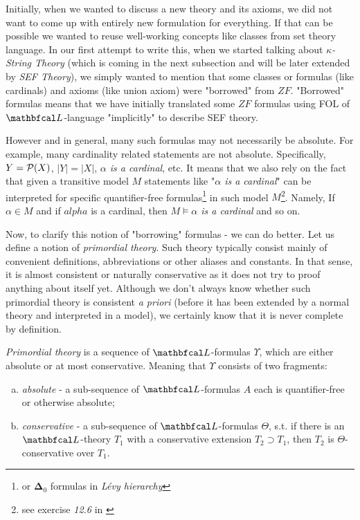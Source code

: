 Initially, when we wanted to discuss a new theory and its axioms, we did not want to come up with entirely new formulation for everything. If that can be possible we wanted to reuse well-working concepts like classes from set theory language. In our first attempt to write this, when we started talking about \textit{$\kappa$-String Theory} (which is coming in the next subsection and will be later extended by \textit{SEF Theory}), we simply wanted to mention that some classes or formulas (like cardinals) and axioms (like union axiom) were "borrowed" from $ZF$. "Borrowed" formulas means that we have initially translated some $ZF$ formulas using FOL of $\lsign$-language \cite{marker2002model} "implicitly" to describe SEF theory.

However and in general, many such formulas may not necessarily be absolute. For example, many cardinality related statements are not absolute. Specifically, $Y = \mathcal{P}(X)$, $|Y| = |X|$, \textit{$\alpha$ is a cardinal}, etc. It means that we also rely on the fact that given a transitive model $M$ statements like "\textit{$\alpha$ is a cardinal}" can be interpreted for specific quantifier-free formulas\footnote{or $\boldsymbol{\Delta}_0$ formulas in \textit{Lévy hierarchy}} in such model $M$\footnote{see exercise \textit{12.6} in \cite{jech2003set}}. Namely, If $\alpha \in M$ and if $alpha$ is a cardinal, then \textit{$ M \models \alpha$ is a cardinal} and so on.

Now, to clarify this notion of "borrowing" formulas - we can do better. Let us define a notion of \textit{primordial theory}. Such theory typically consist mainly of convenient definitions, abbreviations or other aliases and constants. In that sense, it is almost consistent or naturally conservative as it does not try to proof anything about itself yet. Although we don't always know whether such primordial theory is consistent \textit{a priori} (before it has been extended by a normal theory and interpreted in a model), we certainly know that it is never complete by definition.


\begin{definition}\label{def_primordial_theory}
  \textit{Primordial theory} is a sequence of $\lsign$-formulas $\Upsilon$, which are either absolute or at most conservative. Meaning that $\Upsilon$ consists of two fragments: 
    \begin{enumerate}[(a)]
      \item \textit{absolute} - a sub-sequence of $\lsign$-formulas $A$ each is quantifier-free or otherwise absolute;
      \item \textit{conservative} - a sub-sequence of $\lsign$-formulas $\Theta$, s.t. if there is an $\lsign$-theory $T_1$ with a conservative extension $T_2 \supset T_1$, then $T_2$ is $\Theta$-conservative over $T_1$.
    \end{enumerate}
\end{definition}

